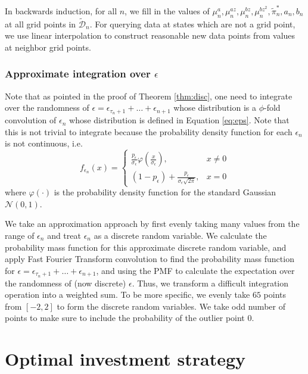 In backwards induction, for all $n$, we fill in the values of $\mu_n^a,\mu_n^{az},\mu_n^{bz},\mu_n^{bz^2},\tilde\pi_n^*,\allowbreak a_n,b_n$ at all grid points in $\tilde{\mathcal D}_n$. For querying data at states which are not a grid point, we use linear interpolation \cite{meijering2002chronology} to construct reasonable new data points from values at neighbor grid points. 

\subsubsection{Approximate integration over $\epsilon$}

Note that as pointed in the proof of Theorem \ref{thm:disc}, one need to integrate over the randomness of $\epsilon=\epsilon_{\tau_n+1}+\ldots+\epsilon_{n+1}$ whose distribution is a $\phi$-fold convolution of $\epsilon_n$ whose distribution is defined in Equation \eqref{eq:eps}. Note that this is not trivial to integrate because the probability density function for each $\epsilon_n$ is not continuous, i.e.$$f_{\epsilon_n}(x)=\begin{cases}
    \frac{p_\epsilon}{\sigma_\epsilon}\varphi\left(\frac{x}{\sigma_\epsilon}\right), \qquad &x\neq 0\\
    (1-p_\epsilon)+\frac{p_\epsilon}{\sigma_\epsilon\sqrt{2\pi}}, &x=0
\end{cases}$$ where $\varphi(\cdot)$ is the probability density function for the standard Gaussian $\mathcal N(0,1)$.

We take an approximation approach by first evenly taking many values from the range of $\epsilon_n$ and treat $\epsilon_n$ as a discrete random variable. We calculate the probability mass function for this approximate discrete random variable, and apply Fast Fourier Transform convolution \cite{brigham1988fast} to find the probability mass function for $\epsilon=\epsilon_{\tau_n+1}+\ldots+\epsilon_{n+1}$, and using the PMF to calculate the expectation over the randomness of (now discrete) $\epsilon$. Thus, we transform a difficult integration operation into a weighted sum. To be more specific, we evenly take $65$ points from $[-2,2]$ to form the discrete random variables. We take odd number of points to make sure to include the probability of the outlier point $0$.

\section{Optimal investment strategy}\label{sec:opt}

